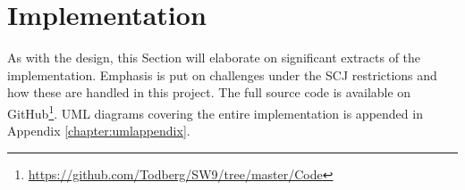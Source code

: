 \section{Implementation}
As with the design, this Section will elaborate on significant extracts of the implementation. Emphasis is put on challenges under the SCJ restrictions and how these are handled in this project. The full source code is available on GitHub\footnote{\url{https://github.com/Todberg/SW9/tree/master/Code}}. UML diagrams covering the entire implementation is appended in Appendix \ref{chapter:umlappendix}.